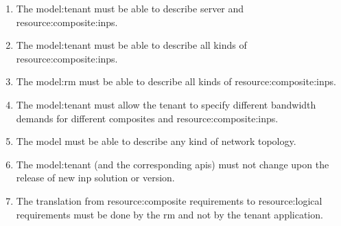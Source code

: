 \begin{enumerate}[
    label=\textbf{FR\arabic*},
    leftmargin=*,
    labelindent=1em
]
    \item \label{requirements:model:tenant:composites}
    The \gls{model:tenant} must be able to describe server and \glspl{resource:composite:inp}.
    
    \item \label{requirements:model:tenant:logical}
    The \gls{model:tenant} must be able to describe all kinds of \glspl{resource:composite:inp}.
    
    \item \label{requirements:model:rm:logical}
    The \gls{model:rm} must be able to describe all kinds of \glspl{resource:composite:inp}.

    \item \label{requirements:model:bandwidth}
    The \gls{model:tenant} must allow the tenant to specify different bandwidth demands for different composites and \glspl{resource:composite:inp}.
    
    \item \label{requirements:model:topology}
    The \gls{model} must be able to describe any kind of network topology.

    \item \label{requirements:model:invariance}
    The \gls{model:tenant} (and the corresponding \glspl{api}) must not change upon the release of new \gls{inp} solution or version.
    
    \item \label{requirements:model:translation}
    The translation from \gls{resource:composite} requirements to \gls{resource:logical} requirements must be done by the \gls{rm} and not by the tenant application.
\end{enumerate}